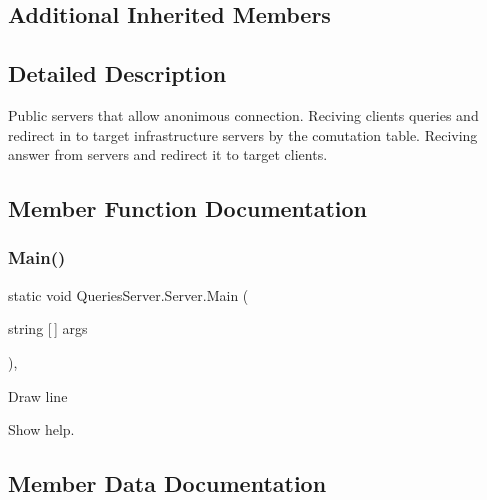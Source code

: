 \subsection*{Additional Inherited Members}


\subsection{Detailed Description}
Public servers that allow anonimous connection. Reciving clients\textquotesingle{} queries and redirect in to target infrastructure servers by the comutation table. Reciving answer from servers and redirect it to target clients. 



\subsection{Member Function Documentation}
\mbox{\label{class_queries_server_1_1_server_ae294b75511557ef0701455c0e2ba785d}} 
\subsubsection{\texorpdfstring{Main()}{Main()}}
{\footnotesize\ttfamily static void Queries\+Server.\+Server.\+Main (\begin{DoxyParamCaption}\item[{string \mbox{[}$\,$\mbox{]}}]{args }\end{DoxyParamCaption})\hspace{0.3cm}{\ttfamily [static]}, {\ttfamily [private]}}

Draw line

Show help. 

\subsection{Member Data Documentation}
\mbox{\label{class_queries_server_1_1_server_a5d7c4c9ababa7292ef7cac92005d3563}} 
